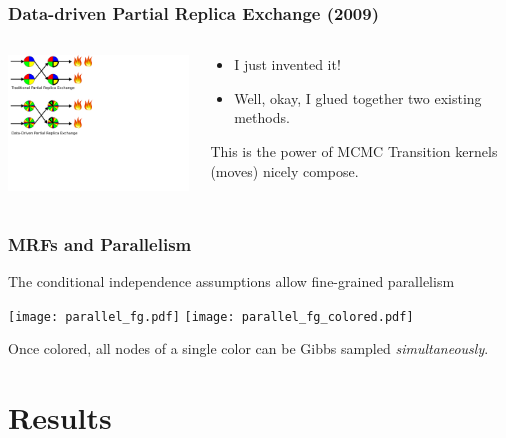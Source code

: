 \documentclass[compress]{beamer}
\begin{document}
\begin{frame}
  \frametitle{Data-driven Partial Replica Exchange (2009)}
  \begin{columns}
    \begin{column}{6cm}
      \includegraphics[width=7cm]{my_partial}
    \end{column}
    
    \begin{column}{4cm}
      \begin{itemize}[<+->]
      \item I just invented it! 
      \item Well, okay, I glued together two existing methods. 
      \end{itemize}
      \pause
      \begin{block}{This is the power of MCMC}
        Transition kernels (moves) nicely compose. 
      \end{block}
    \end{column}
  \end{columns}
\end{frame}
  
\begin{frame}
  \frametitle{MRFs and Parallelism}
  The conditional independence assumptions allow fine-grained parallelism
  \begin{centering}
   {
    \texttt{[image: parallel\_fg.pdf]} 
  } 
   {
    \texttt{[image: parallel\_fg\_colored.pdf]} 
  } 
  \end{centering}
  Once colored, all nodes of a single color can be Gibbs sampled \textit{simultaneously}.

\end{frame}

\section{Results}
\frame{\tableofcontents[currentsection]}
\end{document}
